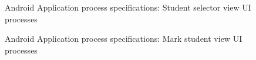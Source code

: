\begin{figure}[H]
\centering	
{}
\caption{Android Application process specifications: Student selector view UI processes}
\end{figure}

\begin{figure}[H]
\centering	
{}
\caption{Android Application process specifications: Mark student view UI processes}
\end{figure}


